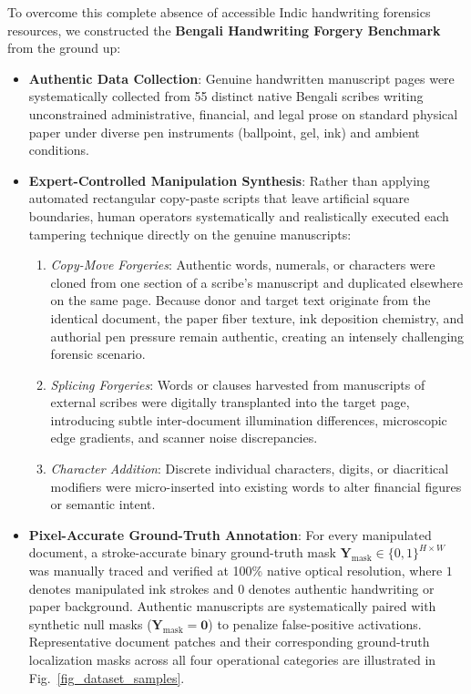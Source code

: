 \documentclass[pdflatex,sn-mathphys-num,iicol]{sn-jnl}
\begin{document}
To overcome this complete absence of accessible Indic handwriting forensics resources, we constructed the \textbf{Bengali Handwriting Forgery Benchmark} from the ground up:
\begin{itemize}
    \item \textbf{Authentic Data Collection}: Genuine handwritten manuscript pages were systematically collected from 55 distinct native Bengali scribes writing unconstrained administrative, financial, and legal prose on standard physical paper under diverse pen instruments (ballpoint, gel, ink) and ambient conditions.
    \item \textbf{Expert-Controlled Manipulation Synthesis}: Rather than applying automated rectangular copy-paste scripts that leave artificial square boundaries, human operators systematically and realistically executed each tampering technique directly on the genuine manuscripts:
    \begin{enumerate}[1.]
        \item \textit{Copy-Move Forgeries}: Authentic words, numerals, or characters were cloned from one section of a scribe's manuscript and duplicated elsewhere on the same page. Because donor and target text originate from the identical document, the paper fiber texture, ink deposition chemistry, and authorial pen pressure remain authentic, creating an intensely challenging forensic scenario.
        \item \textit{Splicing Forgeries}: Words or clauses harvested from manuscripts of external scribes were digitally transplanted into the target page, introducing subtle inter-document illumination differences, microscopic edge gradients, and scanner noise discrepancies.
        \item \textit{Character Addition}: Discrete individual characters, digits, or diacritical modifiers were micro-inserted into existing words to alter financial figures or semantic intent.
    \end{enumerate}
    \item \textbf{Pixel-Accurate Ground-Truth Annotation}: For every manipulated document, a stroke-accurate binary ground-truth mask $\mathbf{Y}_{\text{mask}} \in \{0, 1\}^{H \times W}$ was manually traced and verified at 100\% native optical resolution, where $1$ denotes manipulated ink strokes and $0$ denotes authentic handwriting or paper background. Authentic manuscripts are systematically paired with synthetic null masks ($\mathbf{Y}_{\text{mask}} = \mathbf{0}$) to penalize false-positive activations. Representative document patches and their corresponding ground-truth localization masks across all four operational categories are illustrated in Fig.~\ref{fig_dataset_samples}.
\end{itemize}
\end{document}

